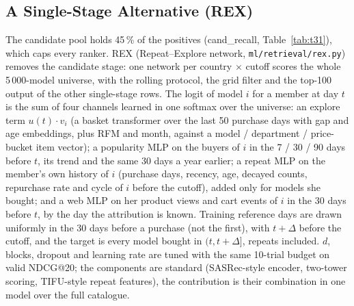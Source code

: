 \documentclass{ieeeaccess}
\begin{document}
\subsection{A Single-Stage Alternative (REX)}
\label{sec:rex}
The candidate pool holds 45\,\% of the positives (cand\_recall, Table~\ref{tab:t31}), which caps every ranker. REX
(Repeat--Explore network, \texttt{ml/retrieval/rex.py}) removes the candidate stage: one network per country $\times$ cutoff scores the
whole 5\,000-model universe, with the rolling protocol, the grid filter and the top-100 output of the other single-stage rows. The
logit of model $i$ for a member at day $t$ is the sum of four channels learned in one softmax over the universe:
an explore term $u(t)\cdot v_i$ (a basket transformer over the last 50 purchase days with gap and age embeddings, plus RFM and
month, against a model / department / price-bucket item vector); a popularity MLP on the buyers of $i$ in the 7 / 30 / 90 days
before $t$, its trend and the same 30 days a year earlier; a repeat MLP on the member's own history of $i$ (purchase days, recency,
age, decayed counts, repurchase rate and cycle of $i$ before the cutoff), added only for models she bought; and a web MLP on her
product views and cart events of $i$ in the 30 days before $t$, by the day the attribution is known. Training reference days are
drawn uniformly in the 30 days before a purchase (not the first), with $t + \Delta$ before the cutoff, and the target is every
model bought in $(t, t + \Delta]$, repeats included. $d$, blocks, dropout and learning rate are tuned with the same 10-trial budget on
valid NDCG@20; the components are standard (SASRec-style encoder, two-tower scoring, TIFU-style repeat features), the
contribution is their combination in one model over the full catalogue.
\end{document}
